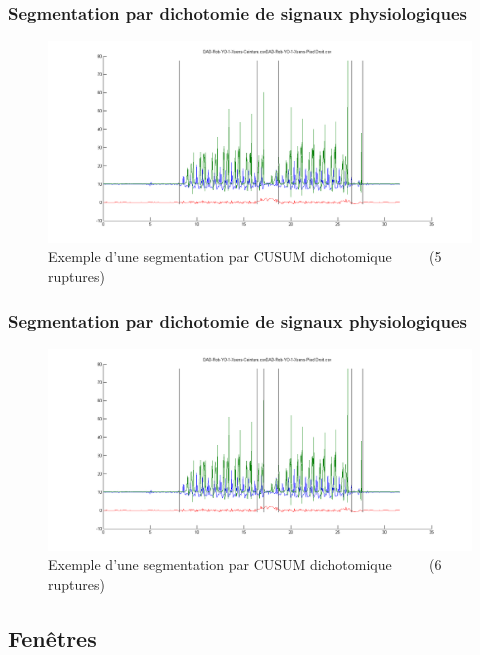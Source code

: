 \documentclass{beamer}
\begin{document}
\begin{frame}
	\frametitle{Segmentation par dichotomie de signaux physiologiques}
	\begin{figure}
		\includegraphics[scale=0.3]{dikt-seg5.png}
		\caption{Exemple d'une segmentation par CUSUM dichotomique
		~~~~
		(5 ruptures)}
	\end{figure}
\end{frame}

\begin{frame}
	\frametitle{Segmentation par dichotomie de signaux physiologiques}
	\begin{figure}
		\includegraphics[scale=0.3]{dikt-seg6.png}
		\caption{Exemple d'une segmentation par CUSUM dichotomique
		~~~~
		(6 ruptures)}
	\end{figure}
\end{frame}


\subsection{Fenêtres}
\end{document}
